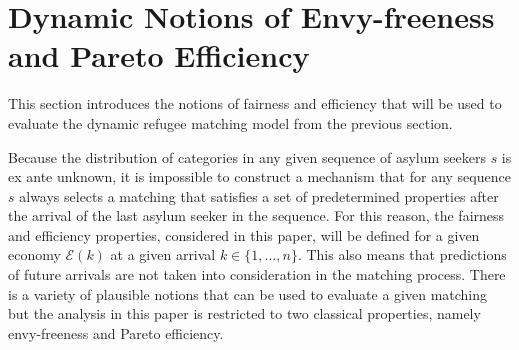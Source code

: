 \documentclass[12pt,fleqn]{article}
\begin{document}
\section{Dynamic Notions of Envy-freeness and Pareto Efficiency}\label{SEC:Fair_Efficient}
This section introduces the notions of fairness and efficiency that will be used to evaluate the dynamic refugee matching model from the previous section.

Because the distribution of categories in any given sequence of asylum seekers $s$ is ex ante unknown, it is impossible to construct a mechanism that for any sequence $s$ always selects a matching that satisfies a set of predetermined properties after the arrival of the last asylum seeker in the sequence. For this reason, the fairness and efficiency properties, considered in this paper, will be defined for a given economy $\mathcal{E}(k)$ at a given arrival $k\in\{1,\ldots,n\}$. This also means that predictions of future arrivals are not taken into consideration in the matching process. There is a variety of plausible notions that can be used to evaluate a given matching but the analysis in this paper is restricted to two classical properties, namely envy-freeness and Pareto efficiency.
\end{document}

